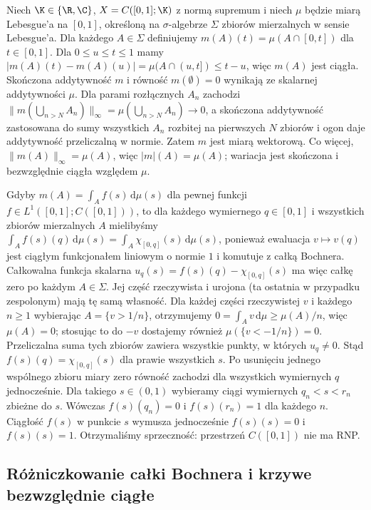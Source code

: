 \begin{przyklad}
\label{ex:rnp-counterexample15b}
Niech $\K\in\{\R,\C\}$, $X=C([0,1];\K)$ z normą supremum
i niech $\mu$ będzie miarą Lebesgue'a na $[0,1]$,
określoną na $\sigma$-algebrze $\Sigma$ zbiorów mierzalnych
w sensie Lebesgue'a. Dla każdego $A\in\Sigma$ definiujemy
$m(A)(t)=\mu(A\cap[0,t])$ dla $t\in[0,1]$.
Dla $0\le u\le t\le1$ mamy
$|m(A)(t)-m(A)(u)|=\mu(A\cap(u,t])\le t-u$,
więc $m(A)$ jest ciągła. Skończona addytywność $m$ i
równość $m(\emptyset)=0$ wynikają ze skalarnej addytywności
$\mu$. Dla parami rozłącznych $A_n$ zachodzi
$\|m(\bigcup_{n>N}A_n)\|_\infty
=\mu(\bigcup_{n>N}A_n)\to0$,
a skończona addytywność zastosowana do sumy wszystkich
$A_n$ rozbitej na pierwszych $N$ zbiorów i ogon daje
addytywność przeliczalną w normie. Zatem $m$ jest miarą
wektorową. Co więcej, $\|m(A)\|_\infty=\mu(A)$, więc
$|m|(A)=\mu(A)$; wariacja jest skończona i
bezwzględnie ciągła względem $\mu$.

Gdyby $m(A)=\int_Af(s)\,\mathrm d\mu(s)$ dla pewnej funkcji
$f\in L^1([0,1];C([0,1]))$, to dla każdego wymiernego
$q\in[0,1]$ i wszystkich zbiorów mierzalnych $A$
mielibyśmy
$\int_A f(s)(q)\,\mathrm d\mu(s)
=\int_A\chi_{[0,q]}(s)\,\mathrm d\mu(s)$,
ponieważ ewaluacja $v\mapsto v(q)$ jest ciągłym
funkcjonałem liniowym o normie $1$ i komutuje z całką
Bochnera. Całkowalna funkcja skalarna
$u_q(s)=f(s)(q)-\chi_{[0,q]}(s)$ ma więc całkę zero
po każdym $A\in\Sigma$. Jej część rzeczywista i urojona
(ta ostatnia w przypadku zespolonym) mają tę samą własność.
Dla każdej części rzeczywistej $v$ i każdego $n\ge1$
wybierając $A=\{v>1/n\}$, otrzymujemy
$0=\int_A v\,\mathrm d\mu\ge\mu(A)/n$, więc $\mu(A)=0$;
stosując to do $-v$ dostajemy również
$\mu(\{v<-1/n\})=0$. Przeliczalna suma tych zbiorów
zawiera wszystkie punkty, w których $u_q\ne0$.
Stąd $f(s)(q)=\chi_{[0,q]}(s)$ dla prawie wszystkich $s$.
Po usunięciu jednego wspólnego zbioru miary zero równość
zachodzi dla wszystkich wymiernych $q$ jednocześnie.
Dla takiego $s\in(0,1)$ wybieramy ciągi wymiernych
$q_n<s<r_n$ zbieżne do $s$. Wówczas $f(s)(q_n)=0$
i $f(s)(r_n)=1$ dla każdego $n$. Ciągłość $f(s)$
w punkcie $s$ wymusza jednocześnie $f(s)(s)=0$ i $f(s)(s)=1$.
Otrzymaliśmy sprzeczność: przestrzeń $C([0,1])$ nie ma RNP.
\end{przyklad}

\subsection{Różniczkowanie całki Bochnera i krzywe bezwzględnie ciągłe}

